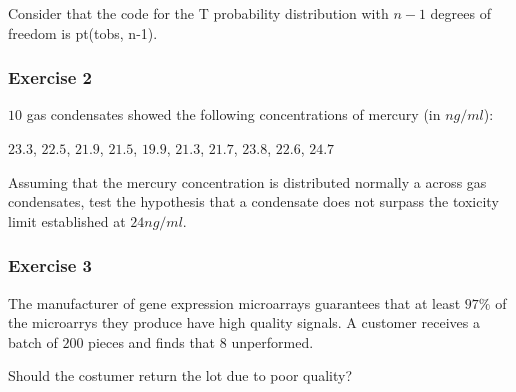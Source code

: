 \documentclass[
]{book}
\begin{document}
Consider that the code for the T probability distribution with \(n-1\) degrees of freedom is pt(tobs, n-1).

\hypertarget{exercise-2-10}{%
\subsubsection{Exercise 2}\label{exercise-2-10}}

\(10\) gas condensates showed the following concentrations of mercury (in \(ng/ml\)):

\(23.3\), \(22.5\), \(21.9\), \(21.5\), \(19.9\), \(21.3\), \(21.7\), \(23.8\), \(22.6\), \(24.7\)

Assuming that the mercury concentration is distributed normally a across gas condensates, test the hypothesis that a condensate does not surpass the toxicity limit established at \(24 ng/ml\).

\hypertarget{exercise-3-7}{%
\subsubsection{Exercise 3}\label{exercise-3-7}}

The manufacturer of gene expression microarrays guarantees that at least \(97\%\) of the microarrys they produce have high quality signals. A customer receives a batch of \(200\) pieces and finds that \(8\) unperformed.

Should the costumer return the lot due to poor quality?

  
\end{document}
